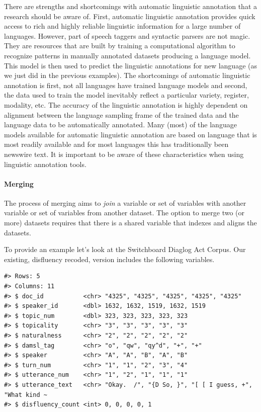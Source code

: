 \documentclass[
]{article}
\begin{document}
There are strengths and shortcomings with automatic linguistic annotation that a research should be aware of. First, automatic linguistic annotation provides quick access to rich and highly reliable linguistic information for a large number of languages. However, part of speech taggers and syntactic parsers are not magic. They are resources that are built by training a computational algorithm to recognize patterns in manually annotated datasets producing a language model. This model is then used to predict the linguistic annotations for new language (as we just did in the previous examples). The shortcomings of automatic linguistic annotation is first, not all languages have trained language models and second, the data used to train the model inevitably reflect a particular variety, register, modality, etc. The accuracy of the linguistic annotation is highly dependent on alignment between the language sampling frame of the trained data and the language data to be automatically annotated. Many (most) of the language models available for automatic linguistic annotation are based on language that is most readily available and for most languages this has traditionally been newswire text. It is important to be aware of these characteristics when using linguistic annotation tools.

\hypertarget{merging}{%
\paragraph{Merging}\label{merging}}

The process of merging aims to \emph{join} a variable or set of variables with another variable or set of variables from another dataset. The option to merge two (or more) datasets requires that there is a shared variable that indexes and aligns the datasets.

To provide an example let's look at the Switchboard Diaglog Act Corpus. Our existing, disfluency recoded, version includes the following variables.

\begin{verbatim}
#> Rows: 5
#> Columns: 11
#> $ doc_id           <chr> "4325", "4325", "4325", "4325", "4325"
#> $ speaker_id       <dbl> 1632, 1632, 1519, 1632, 1519
#> $ topic_num        <dbl> 323, 323, 323, 323, 323
#> $ topicality       <chr> "3", "3", "3", "3", "3"
#> $ naturalness      <chr> "2", "2", "2", "2", "2"
#> $ damsl_tag        <chr> "o", "qw", "qy^d", "+", "+"
#> $ speaker          <chr> "A", "A", "B", "A", "B"
#> $ turn_num         <chr> "1", "1", "2", "3", "4"
#> $ utterance_num    <chr> "1", "2", "1", "1", "1"
#> $ utterance_text   <chr> "Okay.  /", "{D So, }", "[ [ I guess, +", "What kind ~
#> $ disfluency_count <int> 0, 0, 0, 0, 1
\end{verbatim}
\end{document}
